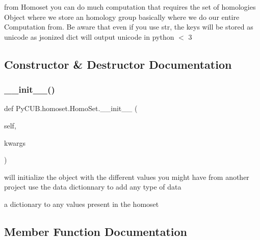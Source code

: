 from Homoset you can do much computation that requires the set of homologies Object where we store an homology group basically where we do our entire Computation from. Be aware that even if you use str, the keys will be stored as unicode as jsonized dict will output unicode in python $<$ 3 

\subsection{Constructor \& Destructor Documentation}
\mbox{\label{class_py_c_u_b_1_1homoset_1_1_homo_set_adbe4d9e4087fe5b53d861476c011329d}} 
\subsubsection{\texorpdfstring{\+\_\+\+\_\+init\+\_\+\+\_\+()}{\_\_init\_\_()}}
{\footnotesize\ttfamily def Py\+C\+U\+B.\+homoset.\+Homo\+Set.\+\_\+\+\_\+init\+\_\+\+\_\+ (\begin{DoxyParamCaption}\item[{}]{self,  }\item[{}]{kwargs }\end{DoxyParamCaption})}



will initialize the object with the different values you might have from another project use the data dictionnary to add any type of data 

a dictionary to any values present in the homoset 

\subsection{Member Function Documentation}
\mbox{\label{class_py_c_u_b_1_1homoset_1_1_homo_set_a5211ffec9061ca49c771d070048524a1}} 
